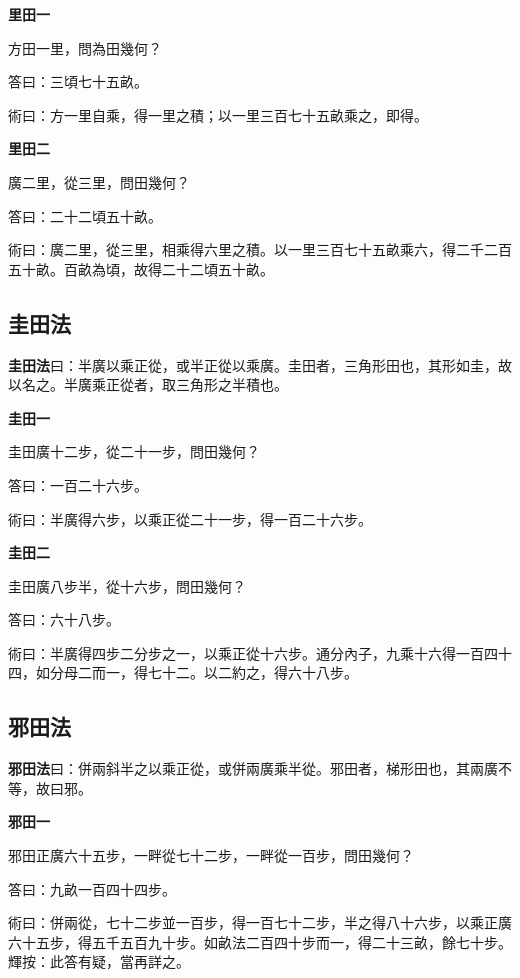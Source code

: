\documentclass[11pt,a4paper]{article}
\newenvironment{problemenv}[1]{%
  \medskip\noindent\textbf{#1}\par\nopagebreak\smallskip
}{\medskip}
\begin{document}
\begin{problemenv}{里田一}
方田一里，問為田幾何？

\textsf{答曰：}三頃七十五畝。

\textsf{術曰：}方一里自乘，得一里之積；以一里三百七十五畝乘之，即得。
\end{problemenv}

\begin{problemenv}{里田二}
廣二里，從三里，問田幾何？

\textsf{答曰：}二十二頃五十畝。

\textsf{術曰：}廣二里，從三里，相乘得六里之積。以一里三百七十五畝乘六，得二千二百五十畝。百畝為頃，故得二十二頃五十畝。
\end{problemenv}

\subsection{圭田法}

\textbf{圭田法}曰：半廣以乘正從，或半正從以乘廣。圭田者，三角形田也，其形如圭，故以名之。半廣乘正從者，取三角形之半積也。

\begin{problemenv}{圭田一}
圭田廣十二步，從二十一步，問田幾何？

\textsf{答曰：}一百二十六步。

\textsf{術曰：}半廣得六步，以乘正從二十一步，得一百二十六步。
\end{problemenv}

\begin{problemenv}{圭田二}
圭田廣八步半，從十六步，問田幾何？

\textsf{答曰：}六十八步。

\textsf{術曰：}半廣得四步二分步之一，以乘正從十六步。通分內子，九乘十六得一百四十四，如分母二而一，得七十二。以二約之，得六十八步。
\end{problemenv}

\subsection{邪田法}

\textbf{邪田法}曰：併兩斜半之以乘正從，或併兩廣乘半從。邪田者，梯形田也，其兩廣不等，故曰邪。

\begin{problemenv}{邪田一}
邪田正廣六十五步，一畔從七十二步，一畔從一百步，問田幾何？

\textsf{答曰：}九畝一百四十四步。

\textsf{術曰：}併兩從，七十二步並一百步，得一百七十二步，半之得八十六步，以乘正廣六十五步，得五千五百九十步。如畝法二百四十步而一，得二十三畝，餘七十步。輝按：此答有疑，當再詳之。
\end{problemenv}
\end{document}
